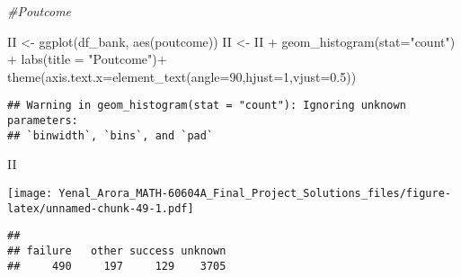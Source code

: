 \documentclass[
]{article}
\newenvironment{Shaded}{\begin{snugshade}}{\end{snugshade}}
\newcommand{\AttributeTok}[1]{\textcolor[rgb]{0.77,0.63,0.00}{#1}}
\newcommand{\CommentTok}[1]{\textcolor[rgb]{0.56,0.35,0.01}{\textit{#1}}}
\newcommand{\DecValTok}[1]{\textcolor[rgb]{0.00,0.00,0.81}{#1}}
\newcommand{\FloatTok}[1]{\textcolor[rgb]{0.00,0.00,0.81}{#1}}
\newcommand{\FunctionTok}[1]{\textcolor[rgb]{0.00,0.00,0.00}{#1}}
\newcommand{\NormalTok}[1]{#1}
\newcommand{\OtherTok}[1]{\textcolor[rgb]{0.56,0.35,0.01}{#1}}
\newcommand{\SpecialCharTok}[1]{\textcolor[rgb]{0.00,0.00,0.00}{#1}}
\newcommand{\StringTok}[1]{\textcolor[rgb]{0.31,0.60,0.02}{#1}}
\begin{document}
\begin{Shaded}
\begin{Highlighting}[]
\CommentTok{\#Poutcome}

\NormalTok{II }\OtherTok{\textless{}{-}} \FunctionTok{ggplot}\NormalTok{(df\_bank, }\FunctionTok{aes}\NormalTok{(poutcome))}
\NormalTok{II }\OtherTok{\textless{}{-}}\NormalTok{ II }\SpecialCharTok{+} \FunctionTok{geom\_histogram}\NormalTok{(}\AttributeTok{stat=}\StringTok{"count"}\NormalTok{) }\SpecialCharTok{+} \FunctionTok{labs}\NormalTok{(}\AttributeTok{title =} \StringTok{"Poutcome"}\NormalTok{)}\SpecialCharTok{+}
  \FunctionTok{theme}\NormalTok{(}\AttributeTok{axis.text.x=}\FunctionTok{element\_text}\NormalTok{(}\AttributeTok{angle=}\DecValTok{90}\NormalTok{,}\AttributeTok{hjust=}\DecValTok{1}\NormalTok{,}\AttributeTok{vjust=}\FloatTok{0.5}\NormalTok{))}
\end{Highlighting}
\end{Shaded}

\begin{verbatim}
## Warning in geom_histogram(stat = "count"): Ignoring unknown parameters:
## `binwidth`, `bins`, and `pad`
\end{verbatim}

\begin{Shaded}
\begin{Highlighting}[]
\NormalTok{II}
\end{Highlighting}
\end{Shaded}

\texttt{[image: Yenal\_Arora\_MATH-60604A\_Final\_Project\_Solutions\_files/figure-latex/unnamed-chunk-49-1.pdf]}

\begin{Shaded}
\end{Shaded}

\begin{verbatim}
## 
## failure   other success unknown 
##     490     197     129    3705
\end{verbatim}

\begin{Shaded}
\end{Shaded}
\end{document}
